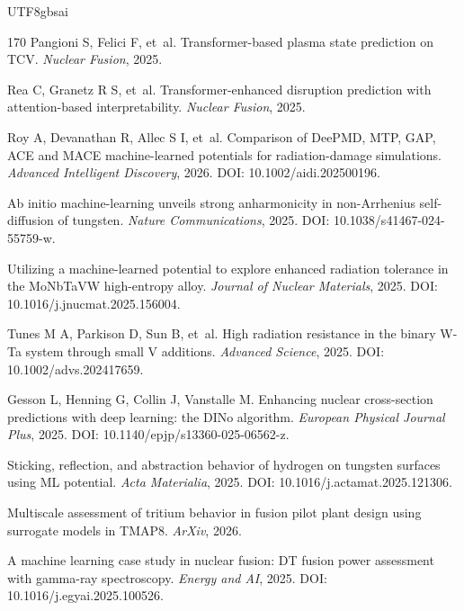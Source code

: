 \documentclass[12pt,a4paper]{article}
\begin{document}
\begin{CJK}{UTF8}{gbsai}
\begin{thebibliography}{170}
Pangioni S, Felici F, et~al.
\newblock Transformer-based plasma state prediction on TCV.
\newblock \textit{Nuclear Fusion}, 2025.

Rea C, Granetz R S, et~al.
\newblock Transformer-enhanced disruption prediction with attention-based interpretability.
\newblock \textit{Nuclear Fusion}, 2025.

Roy A, Devanathan R, Allec S I, et~al.
\newblock Comparison of DeePMD, MTP, GAP, ACE and MACE machine-learned potentials for radiation-damage simulations.
\newblock \textit{Advanced Intelligent Discovery}, 2026. DOI: 10.1002/aidi.202500196.

Ab initio machine-learning unveils strong anharmonicity in non-Arrhenius self-diffusion of tungsten.
\newblock \textit{Nature Communications}, 2025. DOI: 10.1038/s41467-024-55759-w.

Utilizing a machine-learned potential to explore enhanced radiation tolerance in the MoNbTaVW high-entropy alloy.
\newblock \textit{Journal of Nuclear Materials}, 2025. DOI: 10.1016/j.jnucmat.2025.156004.

Tunes M A, Parkison D, Sun B, et~al.
\newblock High radiation resistance in the binary W-Ta system through small V additions.
\newblock \textit{Advanced Science}, 2025. DOI: 10.1002/advs.202417659.

Gesson L, Henning G, Collin J, Vanstalle M.
\newblock Enhancing nuclear cross-section predictions with deep learning: the DINo algorithm.
\newblock \textit{European Physical Journal Plus}, 2025. DOI: 10.1140/epjp/s13360-025-06562-z.

Sticking, reflection, and abstraction behavior of hydrogen on tungsten surfaces using ML potential.
\newblock \textit{Acta Materialia}, 2025. DOI: 10.1016/j.actamat.2025.121306.

Multiscale assessment of tritium behavior in fusion pilot plant design using surrogate models in TMAP8.
\newblock \textit{ArXiv}, 2026.

A machine learning case study in nuclear fusion: DT fusion power assessment with gamma-ray spectroscopy.
\newblock \textit{Energy and AI}, 2025. DOI: 10.1016/j.egyai.2025.100526.


\end{thebibliography}
\end{CJK}
\end{document}
